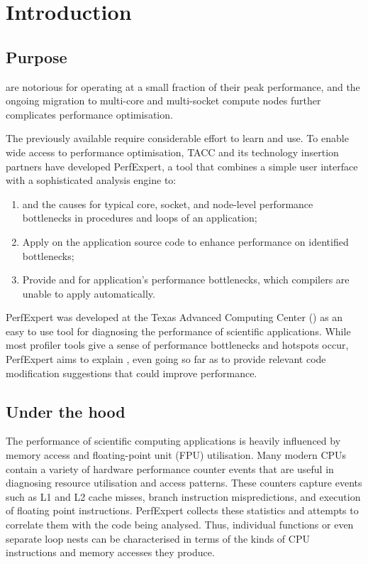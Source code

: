 \chapter{Introduction}
\label{ch:ch01_introduction}
\section{Purpose}
\label{sec:Purpose}

 are notorious for operating at a small fraction of their peak performance, and the ongoing migration to multi-core and multi-socket compute nodes further complicates performance optimisation.

The previously available  require considerable effort to learn and use. To enable wide access to performance optimisation, TACC and its technology insertion partners have developed PerfExpert, a tool that combines a simple user interface with a sophisticated analysis engine to:

\begin{enumerate}
  \item  {} and  the causes for typical core, socket, and node-level performance bottlenecks in procedures and loops of an application;
  \item  Apply  on the application source code to enhance performance on identified bottlenecks;
  \item  Provide  and  for application's performance bottlenecks, which compilers are unable to apply automatically.
\end{enumerate}

PerfExpert was developed at the Texas Advanced Computing Center () as an easy to use tool for diagnosing the performance of scientific applications. While most profiler tools give a sense of  performance bottlenecks and hotspots occur, PerfExpert aims to explain , even going so far as to provide relevant code modification suggestions that could improve performance.

\section{Under the hood}
\label{sec:Under_the_hood}

The performance of scientific computing applications is heavily influenced by memory access and floating-point unit (FPU) utilisation. Many modern CPUs contain a variety of hardware performance counter events that are useful in diagnosing resource utilisation and access patterns. These counters capture events such as L1 and L2 cache misses, branch instruction mispredictions, and execution of floating point instructions. PerfExpert collects these statistics and attempts to correlate them with the code being analysed. Thus, individual functions or even separate loop nests can be characterised in terms of the kinds of CPU instructions and memory accesses they produce.

